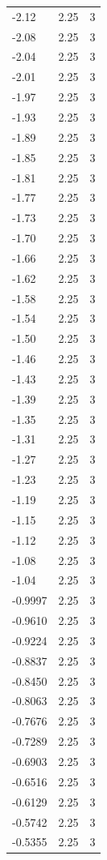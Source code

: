 \begin{longtable}{lrr}
  -2.12 & 2.25 & 3 \\
  -2.08 & 2.25 & 3 \\
  -2.04 & 2.25 & 3 \\
  -2.01 & 2.25 & 3 \\
  -1.97 & 2.25 & 3 \\
  -1.93 & 2.25 & 3 \\
  -1.89 & 2.25 & 3 \\
  -1.85 & 2.25 & 3 \\
  -1.81 & 2.25 & 3 \\
  -1.77 & 2.25 & 3 \\
  -1.73 & 2.25 & 3 \\
  -1.70 & 2.25 & 3 \\
  -1.66 & 2.25 & 3 \\
  -1.62 & 2.25 & 3 \\
  -1.58 & 2.25 & 3 \\
  -1.54 & 2.25 & 3 \\
  -1.50 & 2.25 & 3 \\
  -1.46 & 2.25 & 3 \\
  -1.43 & 2.25 & 3 \\
  -1.39 & 2.25 & 3 \\
  -1.35 & 2.25 & 3 \\
  -1.31 & 2.25 & 3 \\
  -1.27 & 2.25 & 3 \\
  -1.23 & 2.25 & 3 \\
  -1.19 & 2.25 & 3 \\
  -1.15 & 2.25 & 3 \\
  -1.12 & 2.25 & 3 \\
  -1.08 & 2.25 & 3 \\
  -1.04 & 2.25 & 3 \\
  -0.9997 & 2.25 & 3 \\
  -0.9610 & 2.25 & 3 \\
  -0.9224 & 2.25 & 3 \\
  -0.8837 & 2.25 & 3 \\
  -0.8450 & 2.25 & 3 \\
  -0.8063 & 2.25 & 3 \\
  -0.7676 & 2.25 & 3 \\
  -0.7289 & 2.25 & 3 \\
  -0.6903 & 2.25 & 3 \\
  -0.6516 & 2.25 & 3 \\
  -0.6129 & 2.25 & 3 \\
  -0.5742 & 2.25 & 3 \\
  -0.5355 & 2.25 & 3 \\

\end{longtable}
